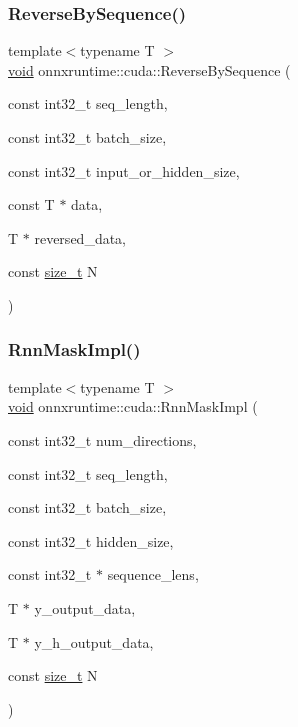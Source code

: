 \subsubsection{\texorpdfstring{Reverse\+By\+Sequence()}{ReverseBySequence()}}
{\footnotesize\ttfamily template$<$typename T $>$ \\
\mbox{\hyperlink{mlasi_8h_a88f941d423cb2a819b70a1358982b1a6}{void}} onnxruntime\+::cuda\+::\+Reverse\+By\+Sequence (\begin{DoxyParamCaption}\item[{const int32\+\_\+t}]{seq\+\_\+length,  }\item[{const int32\+\_\+t}]{batch\+\_\+size,  }\item[{const int32\+\_\+t}]{input\+\_\+or\+\_\+hidden\+\_\+size,  }\item[{const T $\ast$}]{data,  }\item[{T $\ast$}]{reversed\+\_\+data,  }\item[{const \mbox{\hyperlink{mlasi_8h_a503efbc1c6e50825320ad909366b78ab}{size\+\_\+t}}}]{N }\end{DoxyParamCaption})}

\mbox{\label{namespaceonnxruntime_1_1cuda_a26415486136df0da0e096efc908ab00e}} 
\subsubsection{\texorpdfstring{Rnn\+Mask\+Impl()}{RnnMaskImpl()}}
{\footnotesize\ttfamily template$<$typename T $>$ \\
\mbox{\hyperlink{mlasi_8h_a88f941d423cb2a819b70a1358982b1a6}{void}} onnxruntime\+::cuda\+::\+Rnn\+Mask\+Impl (\begin{DoxyParamCaption}\item[{const int32\+\_\+t}]{num\+\_\+directions,  }\item[{const int32\+\_\+t}]{seq\+\_\+length,  }\item[{const int32\+\_\+t}]{batch\+\_\+size,  }\item[{const int32\+\_\+t}]{hidden\+\_\+size,  }\item[{const int32\+\_\+t $\ast$}]{sequence\+\_\+lens,  }\item[{T $\ast$}]{y\+\_\+output\+\_\+data,  }\item[{T $\ast$}]{y\+\_\+h\+\_\+output\+\_\+data,  }\item[{const \mbox{\hyperlink{mlasi_8h_a503efbc1c6e50825320ad909366b78ab}{size\+\_\+t}}}]{N }\end{DoxyParamCaption})}

